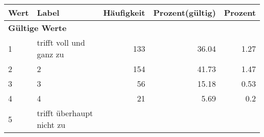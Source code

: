      \begin{longtable}{lXrrr}
     \toprule
     \textbf{Wert} & \textbf{Label} & \textbf{Häufigkeit} & \textbf{Prozent(gültig)} & \textbf{Prozent} \\
     \endhead
     \midrule
     \multicolumn{5}{l}{\textbf{Gültige Werte}}\\

     1 &
     \multicolumn{1}{X}{ trifft voll und ganz zu   } &


       \num{133} &
       \num[round-mode=places,round-precision=2]{36.04} &
         \num[round-mode=places,round-precision=2]{1.27} \\

     2 &
     \multicolumn{1}{X}{ 2   } &


       \num{154} &
       \num[round-mode=places,round-precision=2]{41.73} &
         \num[round-mode=places,round-precision=2]{1.47} \\

     3 &
     \multicolumn{1}{X}{ 3   } &


       \num{56} &
       \num[round-mode=places,round-precision=2]{15.18} &
         \num[round-mode=places,round-precision=2]{0.53} \\

     4 &
     \multicolumn{1}{X}{ 4   } &


       \num{21} &
       \num[round-mode=places,round-precision=2]{5.69} &
         \num[round-mode=places,round-precision=2]{0.2} \\

     5 &
     \multicolumn{1}{X}{ trifft überhaupt nicht zu   } &



\end{longtable}
